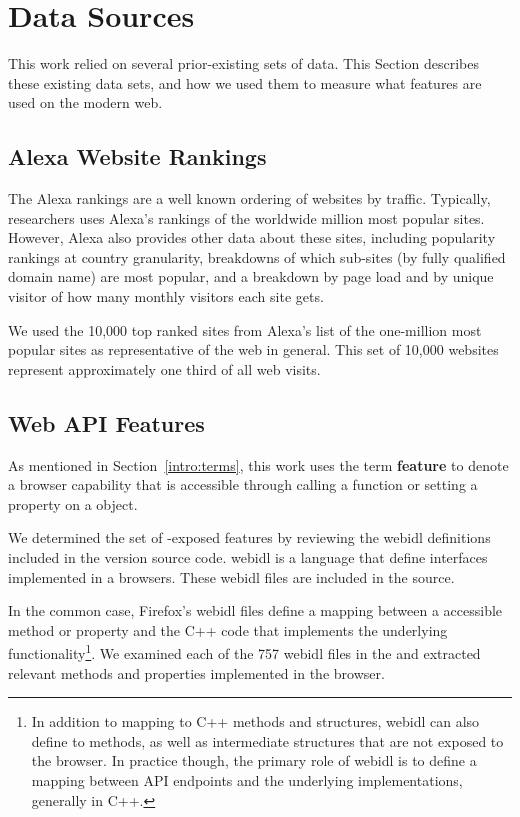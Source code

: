 \section{Data Sources}
\label{measurement:data-sources}

This work relied on several prior-existing sets of data.  This Section
describes these existing data sets, and how we used them to measure what
\JS features are used on the modern web.


\subsection{Alexa Website Rankings}
\label{measurement:data-sources:website-popularity-rankings}
The Alexa rankings are a well known ordering of websites by traffic.
Typically, researchers uses Alexa's rankings of the worldwide million most
popular sites. However, Alexa also provides other data about these sites,
including popularity rankings at country granularity, breakdowns of which
sub-sites (by fully qualified domain name) are most popular, and a breakdown by
page load and by unique visitor of how many monthly visitors each site gets.

We used the 10,000 top ranked sites from Alexa's list of the one-million
most popular sites as representative of the web in general.  This set of 10,000
websites represent approximately one third of all web visits.


\subsection{Web API Features}
\label{measurement:data-sources:method-web-standards}
As mentioned in Section~\ref{intro:terms}, this work uses the term
\textbf{feature} to denote a browser capability that is accessible through
calling a \JS function or setting a property on a \JS object.

We determined the set of \JS-exposed features by reviewing the \gls{webidl}
definitions included in the \FF version \FFversion source code. \gls{webidl} is
a language that define \JS interfaces implemented in a browsers.
These \gls{webidl} files are included in the \FF source.

In the common case, Firefox's \gls{webidl} files define a mapping between a
\JS accessible method or property and the C++ code that implements
the underlying functionality\footnote{In addition to mapping
\JS to C++ methods and structures, \gls{webidl} can also define \JS
to \JS methods, as well as intermediate structures that are not
exposed to the browser.  In practice though, the primary role of \gls{webidl}
is to define a mapping between \JS API endpoints and
the underlying implementations, generally in C++.}. We examined each of the 757
\gls{webidl} files in the \FF and extracted \numfeatures relevant methods and
properties implemented in the browser.


